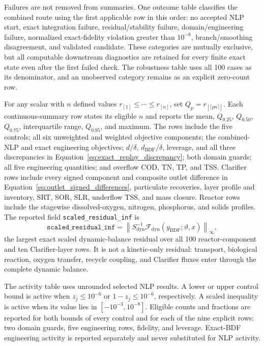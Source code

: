 \documentclass[a4paper,fleqn]{cas-sc}
\begin{document}
Failures are not removed from summaries. One outcome table classifies the combined route using the first applicable row in this order: no accepted NLP start, exact integration failure, residual/stability failure, domain/engineering failure, normalized exact-fidelity violation greater than $10^{-8}$, branch/smoothing disagreement, and validated candidate. These categories are mutually exclusive, but all computable downstream diagnostics are retained for every finite exact state even after the first failed check. The robustness table uses all 100 cases as its denominator, and an unobserved category remains as an explicit zero-count row.

For any scalar with $n$ defined values $r_{[1]}\leq\cdots\leq r_{[n]}$, set $Q_p=r_{[\lceil pn\rceil]}$. Each continuous-summary row states its eligible $n$ and reports the mean, $Q_{0.25}$, $Q_{0.50}$, $Q_{0.75}$, interquartile range, $Q_{0.95}$, and maximum. The rows include the five controls; all six unweighted and weighted objective components; the combined-NLP and exact engineering objectives; $d/\delta$, $d_{\mathrm{BDF}}/\delta$, leverage, and all three discrepancies in Equation~\eqref{eq:exact_replay_discrepancy}; both domain guards; all five engineering quantities; and overflow COD, TN, TP, and TSS. Clarifier rows include every signed component and composite outlet difference in Equation~\eqref{eq:outlet_signed_differences}, particulate recoveries, layer profile and inventory, SRT, SOR, SLR, underflow TSS, and mass closure. Reactor rows include the stagewise dissolved-oxygen, nitrogen, phosphorus, and solids profiles. The reported field \texttt{scaled\_residual\_inf} is
\begin{equation}
\label{eq:reported_scaled_residual}
\texttt{scaled\_residual\_inf}
=\left\|S_{\mathrm{dyn}}^{-1}\mathcal F_{\mathrm{dyn}}
(y_{\mathrm{BDF}};\vartheta,x)\right\|_\infty,
\end{equation}
the largest exact scaled dynamic-balance residual over all 100 reactor-component and ten Clarifier-layer rows. It is not a kinetic-only residual: transport, biological reaction, oxygen transfer, recycle coupling, and Clarifier fluxes enter through the complete dynamic balance.

The activity table uses unrounded selected NLP results. A lower or upper control bound is active when $z_j\leq10^{-6}$ or $1-z_j\leq10^{-6}$, respectively. A scaled inequality is active when its value lies in $[-10^{-3},10^{-8}]$. Eligible counts and fractions are reported for both bounds of every control and for each of the nine explicit rows: two domain guards, five engineering rows, fidelity, and leverage. Exact-BDF engineering activity is reported separately and never substituted for NLP activity.
\end{document}
